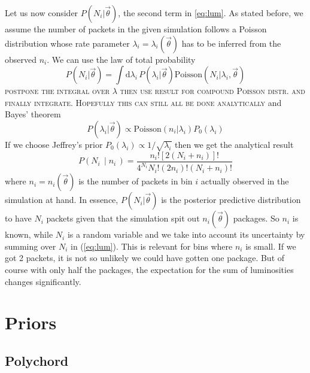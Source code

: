 \documentclass[a4,12pt]{article}
\newcommand{\given}[2]{\left(#1\, \middle| #2 \, \right)}
\newcommand{\poisson}{\ensuremath{\mathrm{Poisson}}}
\newcommand{\rmdx}[1]{\mbox{d} #1 \,} %
\newcommand{\vecth}{\ensuremath{{\vec{\theta}}}}
\def \refeq#1{(\ref{eq:#1})}
\newcommand{\todo}[1]{{\textsc{\color{red}#1}}}
\begin{document}
Let us now consider $P(N_i | \vecth)$, the second term in
\eqref{eq:lum}. As stated before, we assume the number of packets in
the given simulation follows a Poisson distribution whose rate
parameter $\lambda_i = \lambda_i(\vecth)$ has to be inferred from the
observed $n_i$. We can use the law of total probability
\begin{equation}
  P(N_i | \vecth) = \int \rmdx{\lambda_i} P(\lambda_i | \vecth) \poisson(N_i | \lambda_i, \vecth)
\end{equation}
\todo{postpone the integral over $\lambda$ then use result for
  compound Poisson distr. and finally integrate. Hopefully this can
  still all be done analytically} and Bayes' theorem
\begin{equation}
  P(\lambda_i | \vecth) \propto \poisson(n_i | \lambda_i) P_0(\lambda_i)
\end{equation}
If we choose Jeffrey's prior $P_0(\lambda_i) \propto
1/\sqrt{\lambda_i}$ then we get the analytical
result~\cite[Eq. 5]{Aggarwal:2011aa}
\begin{equation}
  P\given{N_i}{n_i} = \frac{n_i! [2 (N_i + n_i)]!}{4^{N_i} N_i! (2 n_i)! (N_i + n_i)!}
\end{equation}
where $n_i = n_i(\vecth)$ is the number of packets in bin $i$ actually
observed in the simulation at hand.  In essence, $P(N_i | \vecth)$ is
the posterior predictive distribution to have $N_i$ packets given that
the simulation spit out $n_i(\vecth)$ packages. So $n_i$ is known,
while $N_i$ is a random variable and we take into account its
uncertainty by summing over $N_i$ in \refeq{lum}. This is relevant for bins where $n_i$ is small. If we got
2 packets, it is not so unlikely we could have gotten one package. But
of course with only half the packages, the expectation for the sum of
luminosities changes significantly.

\section{Priors}

\subsection{Polychord}
\end{document}
